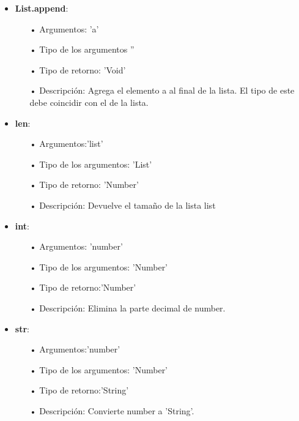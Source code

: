 \documentclass[twoside]{article}
\begin{document}
\begin{itemize}
			\item \textbf{List.append}:\\
			\begin{itemize}
				\item[•] Argumentos: 'a'\\
				\item[•] Tipo de los argumentos ''\\ 
				\item[•] Tipo de retorno: 'Void'\\
				\item[•] Descripci\'on: Agrega el elemento a al final de la lista. El tipo de este debe coincidir con el de la lista.
			\end{itemize}\vspace{0.2cm}
			
			\item \textbf{len}:\\
			\begin{itemize}
				\item[•] Argumentos:'list' \\
				\item[•] Tipo de los argumentos: 'List'\\ 
				\item[•] Tipo de retorno: 'Number'\\
				\item[•] Descripci\'on: Devuelve el tamaño de la lista list
			\end{itemize}\vspace{0.2cm}
			
			\item \textbf{int}:\\
			\begin{itemize}
				\item[•] Argumentos: 'number'\\
				\item[•] Tipo de los argumentos: 'Number'\\ 
				\item[•] Tipo de retorno:'Number'\\
				\item[•] Descripci\'on: Elimina la parte decimal de number.
			\end{itemize}\vspace{0.2cm}
			
			\item \textbf{str}:\\
			\begin{itemize}
				\item[•] Argumentos:'number'\\
				\item[•] Tipo de los argumentos: 'Number'\\ 
				\item[•] Tipo de retorno:'String'\\
				\item[•] Descripci\'on: Convierte number a 'String'.
			\end{itemize}\vspace{0.2cm}
			

\end{itemize}
\end{document}
